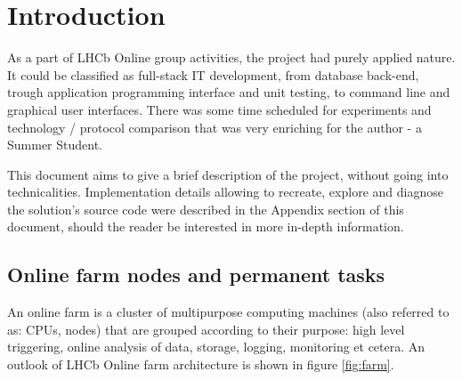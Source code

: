 \documentclass{customization}
\begin{document}
\tabledematieres  %




\section{Introduction}
\hspace{0.6cm}

As a part of LHCb Online group activities, the project had purely applied nature. It could be classified as full-stack IT development, from database back-end, trough application programming interface and unit testing, to command line and graphical user interfaces. There was some time scheduled for experiments and technology / protocol comparison that was very enriching for the author - a Summer Student.
\newline

\noindent
This document aims to give a brief description of the project, without going into technicalities. Implementation details allowing to recreate, explore and diagnose the solution's source code were described in the Appendix section of this document, should the reader be interested in more in-depth information.

\subsection{Online farm nodes and permanent tasks}
\hspace{0.6cm}

An online farm is a cluster of multipurpose computing machines (also referred to as: CPUs, nodes) that are grouped according to their purpose: high level triggering, online analysis of data, storage, logging, monitoring et cetera. An outlook of LHCb Online farm architecture is shown in figure \ref{fig:farm}.
\end{document}
